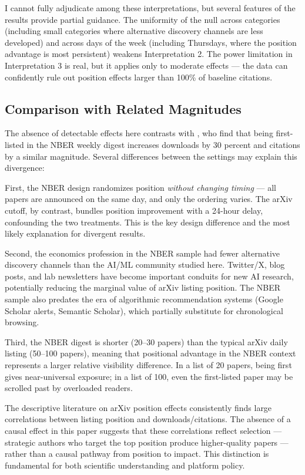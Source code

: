 \documentclass[12pt]{article}
\begin{document}
I cannot fully adjudicate among these interpretations, but several features of the results provide partial guidance. The uniformity of the null across categories (including small categories where alternative discovery channels are less developed) and across days of the week (including Thursdays, where the position advantage is most persistent) weakens Interpretation 2. The power limitation in Interpretation 3 is real, but it applies only to moderate effects --- the data can confidently rule out position effects larger than 100\% of baseline citations.

\subsection{Comparison with Related Magnitudes}

The absence of detectable effects here contrasts with \citet{feenberg2017}, who find that being first-listed in the NBER weekly digest increases downloads by 30 percent and citations by a similar magnitude. Several differences between the settings may explain this divergence:

First, the NBER design randomizes position \textit{without changing timing} --- all papers are announced on the same day, and only the ordering varies. The arXiv cutoff, by contrast, bundles position improvement with a 24-hour delay, confounding the two treatments. This is the key design difference and the most likely explanation for divergent results.

Second, the economics profession in the NBER sample had fewer alternative discovery channels than the AI/ML community studied here. Twitter/X, blog posts, and lab newsletters have become important conduits for new AI research, potentially reducing the marginal value of arXiv listing position. The NBER sample also predates the era of algorithmic recommendation systems (Google Scholar alerts, Semantic Scholar), which partially substitute for chronological browsing.

Third, the NBER digest is shorter (20--30 papers) than the typical arXiv daily listing (50--100 papers), meaning that positional advantage in the NBER context represents a larger relative visibility difference. In a list of 20 papers, being first gives near-universal exposure; in a list of 100, even the first-listed paper may be scrolled past by overloaded readers.

The descriptive literature on arXiv position effects \citep{haque2009, haque2010, dietrich2008} consistently finds large correlations between listing position and downloads/citations. The absence of a causal effect in this paper suggests that these correlations reflect selection --- strategic authors who target the top position produce higher-quality papers --- rather than a causal pathway from position to impact. This distinction is fundamental for both scientific understanding and platform policy.
\end{document}

